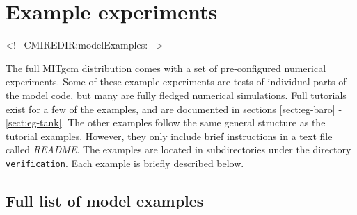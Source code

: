 
\section[MITgcm Example Experiments]{Example experiments}
\label{sect:modelExamples}
\begin{rawhtml}
<!-- CMIREDIR:modelExamples: -->
\end{rawhtml}


The full MITgcm distribution comes with a set of pre-configured
numerical experiments.  Some of these example experiments are tests of
individual parts of the model code, but many are fully fledged
numerical simulations. Full tutorials exist for a few of the examples,
and are documented in sections \ref{sect:eg-baro} -
\ref{sect:eg-tank}. The other examples follow the same general
structure as the tutorial examples. However, they only include brief
instructions in a text file called {\it README}.  The examples are
located in subdirectories under the directory \texttt{verification}.
Each example is briefly described below.

\subsection{Full list of model examples}

